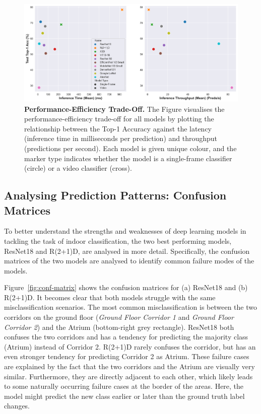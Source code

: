 \documentclass[a4paper]{article}
\begin{document}
\begin{figure}
\centering
\includegraphics[width=\textwidth]{
./figures/performance-efficiency-tradeoff-scatter.png}
\caption{
  \textbf{Performance-Efficiency Trade-Off.} The Figure visualises the
  performance-efficiency trade-off for all models by plotting the
  relationship between the Top-1 Accuracy against the latency (inference
  time in milliseconds per prediction) and throughput (predictions per
  second). Each model is given unique colour, and the marker type indicates
  whether the model is a single-frame classifier (circle) or a video
  classifier (cross).
}

\label{fig:tradeoff}
\end{figure}


\subsection{Analysing Prediction Patterns: Confusion Matrices} %
\label{sub:conf-matrices}

To better understand the strengths and weaknesses of deep learning models in
tackling the task of indoor classification, the two best performing models,
ResNet18 and R(2+1)D, are analysed in more detail. Specifically, the confusion
matrices of the two models are analysed to identify common failure modes of
the models.

Figure~\ref{fig:conf-matrix} shows the confusion matrices for (a) ResNet18 and
(b) R(2+1)D. It becomes clear that both models struggle with the same
misclassification scenarios. The most common misclassification is between the
two corridors on the ground floor (\textit{Ground Floor Corridor 1} and
\textit{Ground Floor Corridor 2}) and the Atrium (bottom-right grey
rectangle). ResNet18 both confuses the two corridors and has a tendency for
predicting the majority class (Atrium) instead of Corridor 2. R(2+1)D rarely
confuses the corridor, but has an even stronger tendency for predicting
Corridor 2 as Atrium. These failure cases are explained by the fact that the
two corridors and the Atrium are visually very similar. Furthermore, they are
directly adjacent to each other, which likely leads to some naturally
occurring failure cases at the border of the areas. Here, the model might
predict the new class earlier or later than the ground truth label changes.
\end{document}
